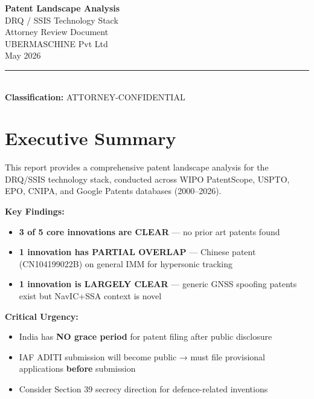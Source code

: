 \documentclass[11pt,a4paper]{article}
\begin{document}
\begin{center}
\vspace*{1cm}
{\LARGE\bfseries Patent Landscape Analysis}\\[0.3em]
{\large DRQ / SSIS Technology Stack}\\[1em]
{\normalsize Attorney Review Document}\\[0.3em]
{\small UBERMASCHINE Pvt Ltd}\\[0.3em]
{\small May 2026}\\[1em]
\rule{0.6\textwidth}{0.5pt}\\[0.5em]
{\small\textbf{Classification:} ATTORNEY-CONFIDENTIAL}
\end{center}

\vspace{1cm}

\section{Executive Summary}

This report provides a comprehensive patent landscape analysis for the DRQ/SSIS technology stack, conducted across WIPO PatentScope, USPTO, EPO, CNIPA, and Google Patents databases (2000--2026).

\textbf{Key Findings:}
\begin{itemize}
\item \textcolor{attgreen}{\textbf{3 of 5 core innovations are CLEAR}} — no prior art patents found
\item \textcolor{attyellow}{\textbf{1 innovation has PARTIAL OVERLAP}} — Chinese patent (CN104199022B) on general IMM for hypersonic tracking
\item \textcolor{attgreen}{\textbf{1 innovation is LARGELY CLEAR}} — generic GNSS spoofing patents exist but NavIC+SSA context is novel
\end{itemize}

\textbf{Critical Urgency:}
\begin{itemize}
\item India has \textbf{NO grace period} for patent filing after public disclosure
\item IAF ADITI submission will become public → must file provisional applications \textbf{before} submission
\item Consider Section 39 secrecy direction for defence-related inventions
\end{itemize}
\end{document}
